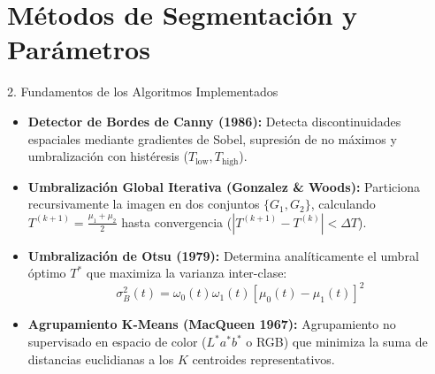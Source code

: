 \documentclass[aspectratio=169,10pt]{beamer}
\begin{document}
\section{Métodos de Segmentación y Parámetros}
\begin{frame}{2. Fundamentos de los Algoritmos Implementados}
    \begin{itemize}
        \item \textbf{Detector de Bordes de Canny (1986):}
        Detecta discontinuidades espaciales mediante gradientes de Sobel, supresión de no máximos y umbralización con histéresis ($T_{\text{low}}, T_{\text{high}}$).
        \item \textbf{Umbralización Global Iterativa (Gonzalez \& Woods):}
        Particiona recursivamente la imagen en dos conjuntos $\{G_1, G_2\}$, calculando $T^{(k+1)} = \frac{\mu_1 + \mu_2}{2}$ hasta convergencia ($|T^{(k+1)} - T^{(k)}| < \Delta T$).
        \item \textbf{Umbralización de Otsu (1979):}
        Determina analíticamente el umbral óptimo $T^*$ que maximiza la varianza inter-clase:
        \begin{equation*}
            \sigma_B^2(t) = \omega_0(t)\omega_1(t)\left[\mu_0(t) - \mu_1(t)\right]^2
        \end{equation*}
        \item \textbf{Agrupamiento K-Means (MacQueen 1967):}
        Agrupamiento no supervisado en espacio de color ($L^*a^*b^*$ o RGB) que minimiza la suma de distancias euclidianas a los $K$ centroides representativos.
    \end{itemize}
\end{frame}
\end{document}
